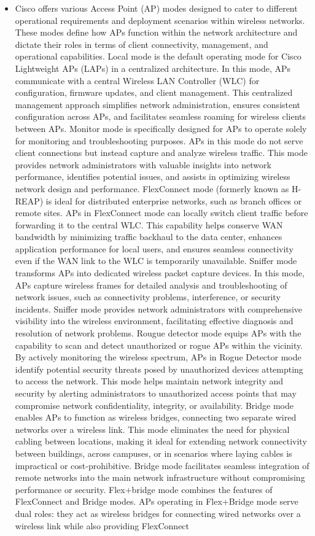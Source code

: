 \documentclass{article}
\begin{document}
\begin{itemize}
	\item[] Cisco offers various Access Point (AP) modes designed to cater to different operational requirements and deployment scenarios within wireless networks. These modes define how APs function within the network architecture and dictate their roles in terms of client connectivity, management, and operational capabilities. Local mode is the default operating mode for Cisco Lightweight APs (LAPs) in a centralized architecture. In this mode, APs communicate with a central Wireless LAN Controller (WLC) for configuration, firmware updates, and client management. This centralized management approach simplifies network administration, ensures consistent configuration across APs, and facilitates seamless roaming for wireless clients between APs. Monitor mode is specifically designed for APs to operate solely for monitoring and troubleshooting purposes. APs in this mode do not serve client connections but instead capture and analyze wireless traffic. This mode provides network administrators with valuable insights into network performance, identifies potential issues, and assists in optimizing wireless network design and performance. FlexConnect mode (formerly known as H-REAP) is ideal for distributed enterprise networks, such as branch offices or remote sites. APs in FlexConnect mode can locally switch client traffic before forwarding it to the central WLC. This capability helps conserve WAN bandwidth by minimizing traffic backhaul to the data center, enhances application performance for local users, and ensures seamless connectivity even if the WAN link to the WLC is temporarily unavailable. Sniffer mode transforms APs into dedicated wireless packet capture devices. In this mode, APs capture wireless frames for detailed analysis and troubleshooting of network issues, such as connectivity problems, interference, or security incidents. Sniffer mode provides network administrators with comprehensive visibility into the wireless environment, facilitating effective diagnosis and resolution of network problems. Rougue detector mode equips APs with the capability to scan and detect unauthorized or rogue APs within the vicinity. By actively monitoring the wireless spectrum, APs in Rogue Detector mode identify potential security threats posed by unauthorized devices attempting to access the network. This mode helps maintain network integrity and security by alerting administrators to unauthorized access points that may compromise network confidentiality, integrity, or availability. Bridge mode enables APs to function as wireless bridges, connecting two separate wired networks over a wireless link. This mode eliminates the need for physical cabling between locations, making it ideal for extending network connectivity between buildings, across campuses, or in scenarios where laying cables is impractical or cost-prohibitive. Bridge mode facilitates seamless integration of remote networks into the main network infrastructure without compromising performance or security. Flex+bridge mode combines the features of FlexConnect and Bridge modes. APs operating in Flex+Bridge mode serve dual roles: they act as wireless bridges for connecting wired networks over a wireless link while also providing FlexConnect 
\end{itemize}
\end{document}
